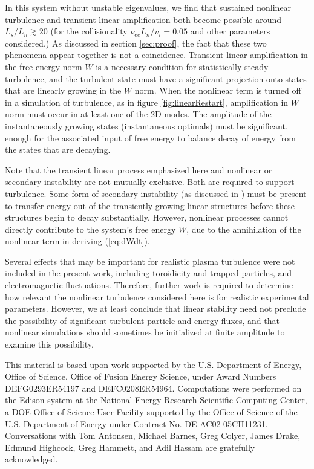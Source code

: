 \documentclass[12pt,superscriptaddress]{revtex4}
\newcommand{\nuee}{\nu_{ee}}
\begin{document}
In this system without unstable eigenvalues, we find that sustained nonlinear turbulence
and transient linear amplification both become possible around $L_s / L_n \gtrsim 20$
(for the collisionality $\nuee L_n / v_i = 0.05$ and other parameters considered.)
As discussed in section \ref{sec:proof}, the fact that these two phenomena appear together is not
a coincidence. Transient linear amplification in the free energy norm $W$ is a necessary condition for statistically steady
turbulence, and the turbulent state must have a significant projection onto states that are linearly growing in the $W$
norm.  When the nonlinear term is turned off in a simulation of turbulence, as in figure \ref{fig:linearRestart},
amplification in $W$ norm must occur in at least one of the 2D modes.
The amplitude of the instantaneously growing states (instantaneous optimals) must be
significant, enough for the associated input of free energy to balance decay of energy
from the states that are decaying.

Note that the transient linear process emphasized here and nonlinear or secondary instability are not mutually
exclusive. Both are required to support turbulence.
Some form of secondary instability (as discussed in \cite{Drake}) must be present to transfer energy out of the transiently growing linear
structures before these structures begin to decay substantially. However, nonlinear processes cannot
directly contribute to the system's free energy $W$, due to the annihilation of the nonlinear term
in deriving (\ref{eq:dWdt}).

Several effects that may be important for realistic plasma turbulence
were not included in the present work, including toroidicity and trapped particles,
and electromagnetic fluctuations.
Therefore, further work is required to determine how relevant the nonlinear turbulence considered here
is for realistic experimental parameters.  However, we at least conclude that linear stability
need not preclude the possibility of significant turbulent particle and energy fluxes,
and that nonlinear simulations should sometimes be initialized at finite amplitude to examine this possibility.

\begin{acknowledgments}
This material is based upon work supported by the
U.S. Department of Energy, Office of Science, Office of Fusion Energy Science,
under Award Numbers DEFG0293ER54197 and DEFC0208ER54964.
Computations were performed on the Edison system at
the National Energy Research Scientific Computing Center, a DOE Office of Science User Facility supported by the Office of Science of the U.S. Department of Energy under Contract No. DE-AC02-05CH11231.
Conversations with 
Tom Antonsen, Michael Barnes, Greg Colyer, James Drake, Edmund Highcock, Greg Hammett, and Adil Hassam
are gratefully acknowledged.
\end{acknowledgments}
\end{document}
